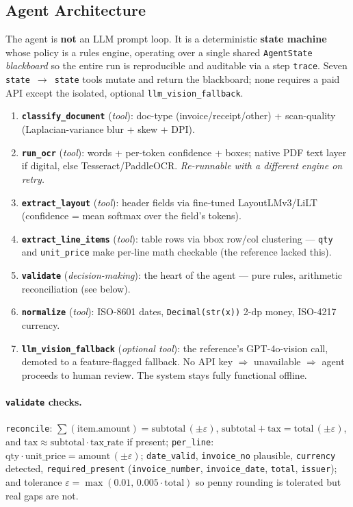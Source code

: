\documentclass[12pt,a4paper]{article}
\begin{document}
\subsection{Agent Architecture}

The agent is \textbf{not} an LLM prompt loop. It is a deterministic \textbf{state
machine} whose policy is a rules engine, operating over a single shared
\texttt{AgentState} \emph{blackboard} so the entire run is reproducible and auditable via
a step \texttt{trace}. Seven \texttt{state\,$\to$\,state} tools mutate and return the
blackboard; none requires a paid API except the isolated, optional
\texttt{llm\_vision\_fallback}.

\begin{enumerate}\setlength\itemsep{0.15em}
  \item \textbf{\texttt{classify\_document}} (\textit{tool}): doc-type (invoice/receipt/other) + scan-quality (Laplacian-variance blur + skew + DPI).
  \item \textbf{\texttt{run\_ocr}} (\textit{tool}): words + per-token confidence + boxes; native PDF text layer if digital, else Tesseract/PaddleOCR. \emph{Re-runnable with a different engine on retry.}
  \item \textbf{\texttt{extract\_layout}} (\textit{tool}): header fields via fine-tuned LayoutLMv3/LiLT (confidence = mean softmax over the field's tokens).
  \item \textbf{\texttt{extract\_line\_items}} (\textit{tool}): table rows via bbox row/col clustering --- \texttt{qty} and \texttt{unit\_price} make per-line math checkable (the reference lacked this).
  \item \textbf{\texttt{validate}} (\textit{decision-making}): the heart of the agent --- pure rules, arithmetic reconciliation (see below).
  \item \textbf{\texttt{normalize}} (\textit{tool}): ISO-8601 dates, \texttt{Decimal(str(x))} 2-dp money, ISO-4217 currency.
  \item \textbf{\texttt{llm\_vision\_fallback}} (\textit{optional tool}): the reference's GPT-4o-vision call, demoted to a feature-flagged fallback. No API key $\Rightarrow$ unavailable $\Rightarrow$ agent proceeds to human review. The system stays fully functional offline.
\end{enumerate}

\paragraph{\texttt{validate} checks.} \texttt{reconcile}:
$\sum(\text{item.amount}) = \text{subtotal}\,(\pm\varepsilon)$,
$\text{subtotal}+\text{tax} = \text{total}\,(\pm\varepsilon)$, and
$\text{tax}\approx\text{subtotal}\cdot\text{tax\_rate}$ if present;
\texttt{per\_line}: $\text{qty}\cdot\text{unit\_price}=\text{amount}\,(\pm\varepsilon)$;
\texttt{date\_valid}, \texttt{invoice\_no} plausible, \texttt{currency} detected,
\texttt{required\_present} (\texttt{invoice\_number}, \texttt{invoice\_date},
\texttt{total}, \texttt{issuer}); and tolerance
$\varepsilon = \max(0.01,\,0.005\cdot\text{total})$ so penny rounding is tolerated but
real gaps are not.
\end{document}
